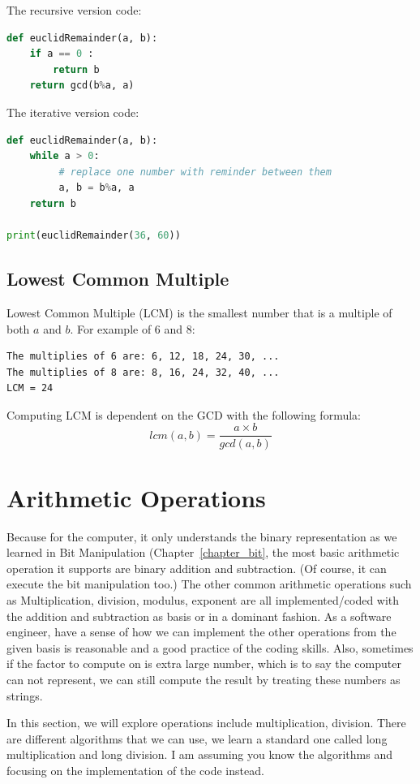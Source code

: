 \documentclass[../main.tex]{subfiles}
\begin{document}
The recursive version code:
\begin{lstlisting}[language = Python]
def euclidRemainder(a, b):
    if a == 0 :
        return b
    return gcd(b%a, a)
\end{lstlisting}
The iterative version code: 
\begin{lstlisting}[language = Python]
def euclidRemainder(a, b):
    while a > 0:
         # replace one number with reminder between them
         a, b = b%a, a
    return b
    
print(euclidRemainder(36, 60))
\end{lstlisting}


\subsection{Lowest Common Multiple}
Lowest Common Multiple (LCM) is the smallest number that is a multiple of both $a$ and $b$. For example of 6 and 8:
\begin{lstlisting}
The multiplies of 6 are: 6, 12, 18, 24, 30, ...
The multiplies of 8 are: 8, 16, 24, 32, 40, ...
LCM = 24
\end{lstlisting}
Computing LCM is dependent on the GCD with the following formula:
\begin{equation}
    lcm(a, b) = \frac{a\times b}{gcd(a, b)}
\end{equation}

\section{Arithmetic Operations}
Because for the computer, it only understands the binary representation as we learned in Bit Manipulation (Chapter~\ref{chapter_bit}, the most basic arithmetic operation it supports are  binary addition and subtraction. (Of course, it can execute the bit manipulation too.)  The other common arithmetic operations such as Multiplication, division, modulus, exponent are all implemented/coded with the addition and subtraction as basis or in a dominant fashion. As a software engineer, have a sense of how we can implement the other operations from the given basis is reasonable and a good practice of the coding skills. Also, sometimes if the factor to compute on is extra large number, which is to say the computer can not represent, we can still compute the result by treating these numbers as strings. 

In this section, we will explore operations include multiplication, division. There are different algorithms that we can use, we learn a standard one called long multiplication and long division. I am assuming you know the algorithms and focusing on the implementation of the code instead. 
\end{document}
